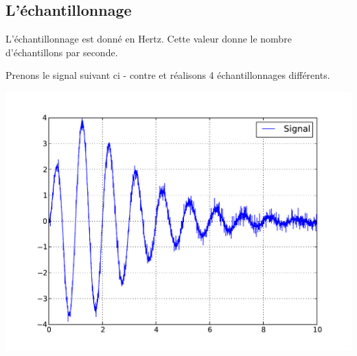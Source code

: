 \documentclass[10pt,fleqn]{article} %
\begin{document}
\subsection{L'échantillonnage}

\begin{minipage}[c]{.45\linewidth}
L'échantillonnage est donné en Hertz. Cette valeur donne le nombre d'échantillons par seconde.

Prenons le signal suivant ci - contre et réalisons 4 échantillonnages différents.
\end{minipage} \hfill
\begin{minipage}[c]{.5\linewidth}
\begin{center}
\includegraphics[width=\textwidth]{images/ech_0.pdf}
\end{center}
\end{minipage}
\end{document}
